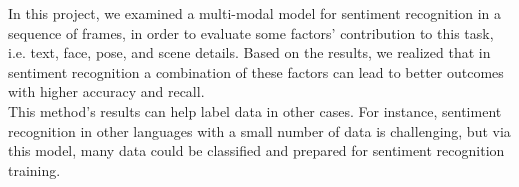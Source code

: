 In this project, we examined a multi-modal model for sentiment recognition in a sequence of frames, in order to evaluate some factors' contribution to this task, i.e. text, face, pose, and scene details. Based on the results, we realized that in sentiment recognition a combination of these factors can lead to better outcomes with higher accuracy and recall.
\\
This method's results can help label data in other cases. For instance, sentiment recognition in other languages with a small number of data is challenging, but via this model, many data could be classified and prepared for sentiment recognition training.


